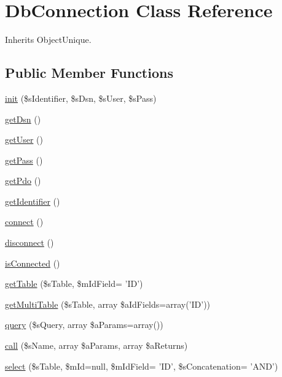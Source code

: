 \hypertarget{class_db_connection}{\section{Db\-Connection Class Reference}
\label{class_db_connection}
}


Inherits Object\-Unique.

\subsection*{Public Member Functions}
\begin{DoxyCompactItemize}
\item 
\hyperlink{class_db_connection_a49c66ab54641f3a1e553a7e643b5c7a8}{init} (\$s\-Identifier, \$s\-Dsn, \$s\-User, \$s\-Pass)
\item 
\hyperlink{class_db_connection_a945af842314b399eca5af3c386f006bd}{get\-Dsn} ()
\item 
\hyperlink{class_db_connection_a8a2466ed0cfd8ad83c8567cbd7508dfa}{get\-User} ()
\item 
\hyperlink{class_db_connection_a52ff2ae755efaa935c79e09f0ac690a0}{get\-Pass} ()
\item 
\hyperlink{class_db_connection_a02ad97e6bc80a2caa7d440327f2b5483}{get\-Pdo} ()
\item 
\hyperlink{class_db_connection_a62dc96f2921f8e69a555352c7b7bd53f}{get\-Identifier} ()
\item 
\hyperlink{class_db_connection_a42741e1c5c39cb28b3ec47d7ac69a315}{connect} ()
\item 
\hyperlink{class_db_connection_a4876746134e556f69028877d061083ed}{disconnect} ()
\item 
\hyperlink{class_db_connection_a094ea04215aed212fc6757335f665088}{is\-Connected} ()
\item 
\hyperlink{class_db_connection_a9d5cbd5705cb5474feee805cc5df642c}{get\-Table} (\$s\-Table, \$m\-Id\-Field= 'I\-D')
\item 
\hyperlink{class_db_connection_af5dece058ebbd7e29126360e8dcf8890}{get\-Multi\-Table} (\$s\-Table, array \$a\-Id\-Fields=array('I\-D'))
\item 
\hyperlink{class_db_connection_ae5144ffd2bfc7fff6bb4847d293e26d8}{query} (\$s\-Query, array \$a\-Params=array())
\item 
\hyperlink{class_db_connection_a96b5e2fdad36ec81aae1a3a26ad7acd7}{call} (\$s\-Name, array \$a\-Params, array \$a\-Returns)
\item 
\hyperlink{class_db_connection_ac0fd349a2a6521372a9b68eeb48e4fab}{select} (\$s\-Table, \$m\-Id=null, \$m\-Id\-Field= 'I\-D', \$s\-Concatenation= 'A\-N\-D')

\end{DoxyCompactItemize}
